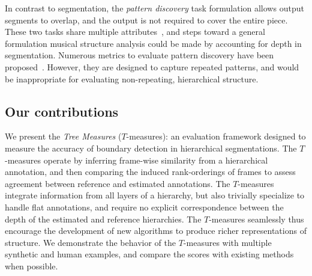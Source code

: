 \documentclass{article}
\begin{document}
In contrast to segmentation, the \emph{pattern discovery} task formulation allows output segments to overlap, 
and the output is not required to cover the entire piece.
These two tasks share multiple attributes~\cite{Nieto2014_Motives}, and steps toward a 
general formulation musical structure analysis could be made by accounting for depth in segmentation.
Numerous metrics to evaluate pattern discovery have been proposed~\cite{Collins2013}.
However, they are designed to capture repeated patterns, and would be inappropriate for 
evaluating non-repeating, hierarchical structure.


\subsection{Our contributions}
We present the \emph{Tree Measures} ($T$-measures): an evaluation framework designed
to measure the accuracy of boundary detection in hierarchical segmentations.
The $T$-measures operate by inferring frame-wise similarity from a hierarchical annotation, and then comparing 
the induced rank-orderings of frames to assess agreement between reference and estimated annotations.
The $T$-measures integrate information from all layers of a hierarchy, but also trivially
specialize to handle flat annotations, and require no explicit correspondence between the
depth of the estimated and reference hierarchies.
The $T$-measures seamlessly thus encourage the development of new algorithms to produce richer representations of structure.
We demonstrate the behavior of the $T$-measures with multiple synthetic and human examples, and compare the scores with existing methods when possible.

\end{document}
